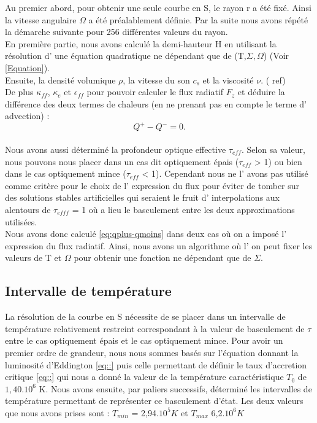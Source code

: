 Au premier abord, pour obtenir une seule courbe en S, le rayon r a été fixé. Ainsi la vitesse angulaire $\Omega$ a été préalablement définie. Par la suite nous avons répété la démarche suivante pour 256 différentes valeurs du rayon.
\\
En première partie, nous avons calculé la demi-hauteur H en utilisant la résolution d' une équation quadratique ne dépendant que de (T,$\Sigma,\Omega$) (Voir \ref{Equation}).
\\
Ensuite, la densité volumique $\rho$, la vitesse du son $c_s$ et la viscosité $\nu$. ( ref)
\\
De plus $\kappa_{ff}$, $\kappa_{e}$ et $\epsilon_{ff}$ pour pouvoir calculer le flux radiatif $F_z$ et déduire la différence des deux termes de chaleurs (en ne prenant pas en compte le terme d' advection) :
\\
\begin{equation} 
\label{eq:qplus-qmoins}
Q^+ - Q^- = 0. 
\end{equation}
\\
Nous avons aussi déterminé la profondeur optique effective $\tau_{eff}$. Selon sa valeur, nous pouvons nous placer dans un cas dit optiquement épais ($\tau_{eff}$ > 1) ou bien dans le cas optiquement mince  ($\tau_{eff}$ < 1).
Cependant nous ne l' avons pas utilisé comme critère pour le choix de l' expression du flux pour éviter de tomber sur des solutions stables artificielles qui seraient le fruit d' interpolations aux alentours de $\tau_{efff}$ = 1 où a lieu le basculement entre les deux approximations utilisées. 
\\
Nous avons donc calculé \ref{eq:qplus-qmoins} dans deux cas où on a imposé l' expression du flux radiatif. Ainsi, nous avons un algorithme où l' on peut fixer les valeurs de T et $\Omega$ pour obtenir une fonction ne dépendant que de $\Sigma$.

\subsection{Intervalle de température}
La résolution de la courbe en S nécessite de se placer dans un intervalle de température relativement restreint correspondant à la valeur de basculement de $\tau$ entre le cas optiquement épais et le cas optiquement mince.
Pour avoir un premier ordre de grandeur, nous nous sommes basés sur l'équation donnant la luminosité d'Eddington \ref{eq::} puis celle permettant de définir le taux d'accretion critique \ref{eq::} qui nous a donné la valeur de la température caractéristique $T_0$ de $1,40.10^6$ K. Nous avons ensuite, par paliers successifs, déterminé les intervalles de température permettant de représenter ce basculement d'état. Les deux valeurs que nous avons prises sont : $T_{min}$ = 2,94.$10^5 K$ et $T_{max}$ 6,2.$10^6 K$ 
\\
